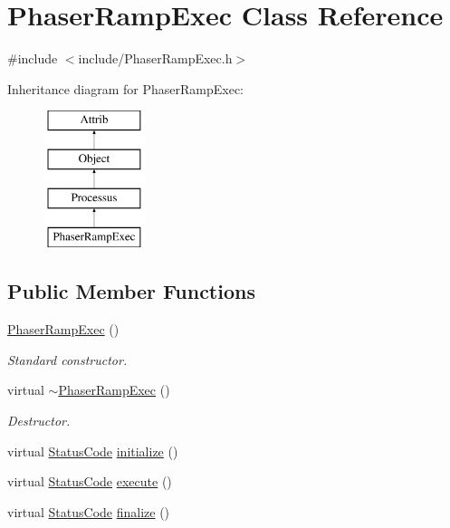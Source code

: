 \hypertarget{classPhaserRampExec}{}\section{Phaser\+Ramp\+Exec Class Reference}
\label{classPhaserRampExec}


{\ttfamily \#include $<$include/\+Phaser\+Ramp\+Exec.\+h$>$}

Inheritance diagram for Phaser\+Ramp\+Exec\+:\begin{figure}[H]
\begin{center}
\leavevmode
\includegraphics[height=4.000000cm]{classPhaserRampExec}
\end{center}
\end{figure}
\subsection*{Public Member Functions}
\begin{DoxyCompactItemize}
\item 
\hyperlink{classPhaserRampExec_a26f14f1c66dd37251374998ae0a4f02a}{Phaser\+Ramp\+Exec} ()
\begin{DoxyCompactList}\small\item\em Standard constructor. \end{DoxyCompactList}\item 
virtual \hyperlink{classPhaserRampExec_a0ea95adf577ff47f09068a20329f1598}{$\sim$\+Phaser\+Ramp\+Exec} ()
\begin{DoxyCompactList}\small\item\em Destructor. \end{DoxyCompactList}\item 
virtual \hyperlink{classStatusCode}{Status\+Code} \hyperlink{classPhaserRampExec_ae6f90f2ecf4b66d6f9bc85b123587ef3}{initialize} ()
\item 
virtual \hyperlink{classStatusCode}{Status\+Code} \hyperlink{classPhaserRampExec_a5fccbd3cddf738318f9d45d64b723907}{execute} ()
\item 
virtual \hyperlink{classStatusCode}{Status\+Code} \hyperlink{classPhaserRampExec_a8849cacdd34e7ca56f6d5e7668fe8c6c}{finalize} ()
\end{DoxyCompactItemize}
